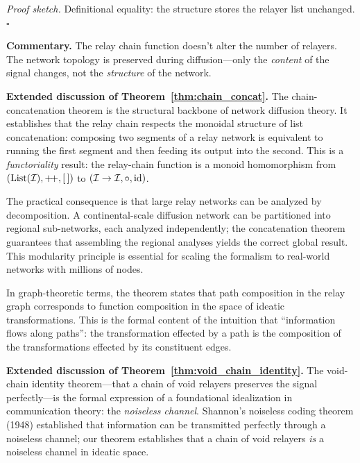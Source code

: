 \noindent\textit{Proof sketch.}\quad
Definitional equality: the structure stores the relayer list unchanged.
\hfill$\square$

\medskip

\noindent\textbf{Commentary.}
The relay chain function doesn't alter the number of relayers.  The network
topology is preserved during diffusion---only the \emph{content} of the
signal changes, not the \emph{structure} of the network.


\noindent\textbf{Extended discussion of Theorem~\ref{thm:chain_concat}.}\quad
The chain-concatenation theorem is the structural backbone of network
diffusion theory.  It establishes that the relay chain respects the monoidal
structure of list concatenation: composing two segments of a relay network
is equivalent to running the first segment and then feeding its output into
the second.  This is a \emph{functoriality} result: the relay-chain
function is a monoid homomorphism from $(\text{List}(\mathcal{I}), {+\!+}, [\,])$
to $(\mathcal{I} \to \mathcal{I}, \circ, \text{id})$.

The practical consequence is that large relay networks can be analyzed by
decomposition.  A continental-scale diffusion network can be partitioned
into regional sub-networks, each analyzed independently; the
concatenation theorem guarantees that assembling the regional analyses
yields the correct global result.  This modularity principle is essential
for scaling the formalism to real-world networks with millions of nodes.

In graph-theoretic terms, the theorem states that path composition in the
relay graph corresponds to function composition in the space of ideatic
transformations.  This is the formal content of the intuition that
``information flows along paths'': the transformation effected by a path
is the composition of the transformations effected by its constituent
edges.

\medskip

\noindent\textbf{Extended discussion of Theorem~\ref{thm:void_chain_identity}.}\quad
The void-chain identity theorem---that a chain of void relayers preserves
the signal perfectly---is the formal expression of a foundational
idealization in communication theory: the \emph{noiseless channel}.
Shannon's noiseless coding theorem (1948) established that information can
be transmitted perfectly through a noiseless channel; our theorem
establishes that a chain of void relayers \emph{is} a noiseless channel in
ideatic space.

